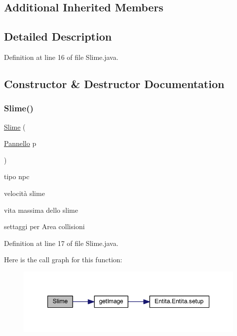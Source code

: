 \subsection*{Additional Inherited Members}


\subsection{Detailed Description}


Definition at line 16 of file Slime.\+java.



\subsection{Constructor \& Destructor Documentation}
\mbox{\label{class_entita_1_1_slime_aab582adc4b82fabcf2dd0ea9012a6726}} 
\subsubsection{\texorpdfstring{Slime()}{Slime()}}
{\footnotesize\ttfamily \hyperlink{class_entita_1_1_slime}{Slime} (\begin{DoxyParamCaption}\item[{\hyperlink{classa_1_1survival_1_1game_1_1_pannello}{Pannello}}]{p }\end{DoxyParamCaption})}

tipo npc

velocità slime

vita massima dello slime

settaggi per Area collisioni

Definition at line 17 of file Slime.\+java.

Here is the call graph for this function\+:
\nopagebreak
\begin{figure}[H]
\begin{center}
\leavevmode
\includegraphics[width=347pt]{class_entita_1_1_slime_aab582adc4b82fabcf2dd0ea9012a6726_cgraph}
\end{center}
\end{figure}


